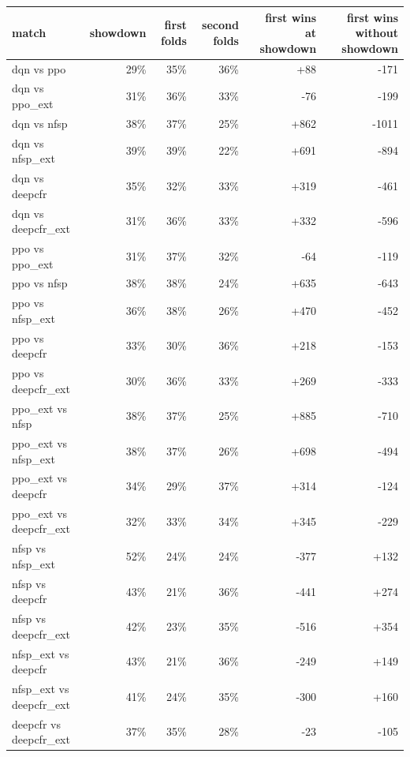 \begin{tabular}{lrrrrr}
\toprule
match & showdown & first folds & second folds & first wins at showdown & first wins without showdown \\
\midrule
dqn vs ppo & 29\% & 35\% & 36\% & +88 & -171 \\
dqn vs ppo\_ext & 31\% & 36\% & 33\% & -76 & -199 \\
dqn vs nfsp & 38\% & 37\% & 25\% & +862 & -1011 \\
dqn vs nfsp\_ext & 39\% & 39\% & 22\% & +691 & -894 \\
dqn vs deepcfr & 35\% & 32\% & 33\% & +319 & -461 \\
dqn vs deepcfr\_ext & 31\% & 36\% & 33\% & +332 & -596 \\
ppo vs ppo\_ext & 31\% & 37\% & 32\% & -64 & -119 \\
ppo vs nfsp & 38\% & 38\% & 24\% & +635 & -643 \\
ppo vs nfsp\_ext & 36\% & 38\% & 26\% & +470 & -452 \\
ppo vs deepcfr & 33\% & 30\% & 36\% & +218 & -153 \\
ppo vs deepcfr\_ext & 30\% & 36\% & 33\% & +269 & -333 \\
ppo\_ext vs nfsp & 38\% & 37\% & 25\% & +885 & -710 \\
ppo\_ext vs nfsp\_ext & 38\% & 37\% & 26\% & +698 & -494 \\
ppo\_ext vs deepcfr & 34\% & 29\% & 37\% & +314 & -124 \\
ppo\_ext vs deepcfr\_ext & 32\% & 33\% & 34\% & +345 & -229 \\
nfsp vs nfsp\_ext & 52\% & 24\% & 24\% & -377 & +132 \\
nfsp vs deepcfr & 43\% & 21\% & 36\% & -441 & +274 \\
nfsp vs deepcfr\_ext & 42\% & 23\% & 35\% & -516 & +354 \\
nfsp\_ext vs deepcfr & 43\% & 21\% & 36\% & -249 & +149 \\
nfsp\_ext vs deepcfr\_ext & 41\% & 24\% & 35\% & -300 & +160 \\
deepcfr vs deepcfr\_ext & 37\% & 35\% & 28\% & -23 & -105 \\
\bottomrule
\end{tabular}
